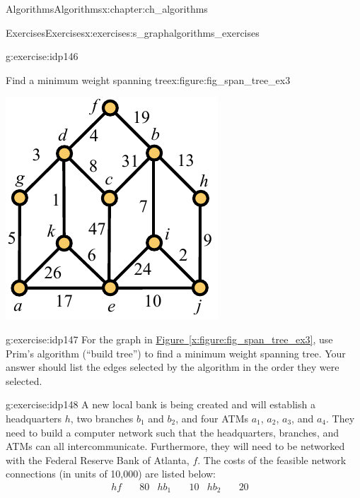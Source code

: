 \documentclass[oneside,10pt,]{book}
\newcommand{\xreffont}{\relax}
\numberwithin{equation}{section}
\newcommand{\amp}{&}
\begin{document}
\begin{chapterptx}{Algorithms}{}{Algorithms}{}{}{x:chapter:ch_algorithms}
\begin{exercises-section}{Exercises}{}{Exercises}{}{}{x:exercises:s_graphalgorithms_exercises}
\begin{divisionexercise}{5}{}{}{g:exercise:idp146}
\begin{figureptx}{Find a minimum weight spanning tree}{x:figure:fig_span_tree_ex3}{}
\begin{image}{0.275}{0.45}{0.275}
\includegraphics[width=\linewidth]{images/span_tree_ex3}
\end{image}%
\tcblower
\end{figureptx}%
\end{divisionexercise}%
\begin{divisionexercise}{6}{}{}{g:exercise:idp147}%
For the graph in \hyperref[x:figure:fig_span_tree_ex3]{Figure~{\xreffont\ref{x:figure:fig_span_tree_ex3}}}, use Prim's algorithm (``build tree'') to find a minimum weight spanning tree. Your answer should list the edges selected by the algorithm in the order they were selected.%
\end{divisionexercise}%
\begin{divisionexercise}{7}{}{}{g:exercise:idp148}%
A new local bank is being created and will establish a headquarters \(h\), two branches \(b_1\) and \(b_2\), and four ATMs \(a_1\), \(a_2\), \(a_3\), and \(a_4\). They need to build a computer network such that the headquarters, branches, and ATMs can all intercommunicate. Furthermore, they will need to be networked with the Federal Reserve Bank of Atlanta, \(f\). The costs of the feasible network connections (in units of \textdollar{}10,000) are listed below:%
\begin{align*}
h f \amp  \quad 80 \amp 
h b_1 \amp  \quad 10\amp  h b_2 \amp  \quad 20\amp 

\end{align*}
\end{divisionexercise}
\end{exercises-section}
\end{chapterptx}
\end{document}
